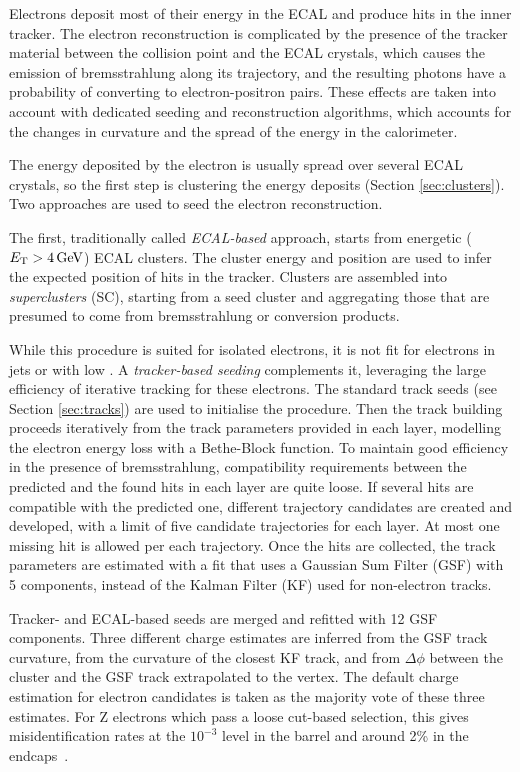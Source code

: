 \label{sec:eleReco}
Electrons deposit most of their energy in the ECAL and produce hits in the inner tracker.
The electron reconstruction is complicated by the presence of the tracker material between the collision point and the ECAL crystals,
which causes the emission of bremsstrahlung along its trajectory, and the resulting photons have a probability of converting to electron-positron pairs.
These effects are taken into account with dedicated seeding and reconstruction algorithms,
which accounts for the changes in curvature and the spread of the energy in the calorimeter.

The energy deposited by the electron is usually spread over several ECAL crystals, so the first step is clustering the energy deposits (Section \ref{sec:clusters}).
Two approaches are used to seed the electron reconstruction.

The first, traditionally called \textit{ECAL-based} approach, starts from energetic ($E_{\mathrm{T}} > 4\,\text{Ge\hspace{-.08em}V}$) ECAL clusters.
The cluster energy and position are used to infer the expected position of hits in the tracker.
Clusters are assembled into \textit{superclusters} (SC),
starting from a seed cluster and aggregating those that are presumed to come from bremsstrahlung or conversion products.

While this procedure is suited for isolated electrons, it is not fit for electrons in jets or with low \pt.
A \textit{tracker-based seeding} complements it, leveraging the large efficiency of iterative tracking for these electrons.
The standard track seeds (see Section \ref{sec:tracks}) are used to initialise the procedure.
Then the track building proceeds iteratively from the track parameters provided in each layer, modelling the electron energy loss with a Bethe-Block function.
To maintain good efficiency in the presence of bremsstrahlung, compatibility requirements between the predicted and the found hits in each layer are quite loose.
If several hits are compatible with the predicted one, different trajectory candidates are created and developed,
with a limit of five candidate trajectories for each layer.
At most one missing hit is allowed per each trajectory.
Once the hits are collected, the track parameters are estimated with a fit that uses a Gaussian Sum Filter (GSF) \cite{CMS-NOTE-2005-001} with 5 components,
instead of the Kalman Filter (KF) \cite{billoir.qian:simultaneous} used for non-electron tracks.

Tracker- and ECAL-based seeds are merged and refitted with 12 GSF components.
Three different charge estimates are inferred from the GSF track curvature,
from the curvature of the closest KF track, and from $\Delta\phi$ between the cluster and the GSF track extrapolated to the vertex.
The default charge estimation for electron candidates is taken as the majority vote of these three estimates.
For Z electrons which pass a loose cut-based selection, this gives misidentification rates at the $10^{-3}$ level in the barrel
and around 2\usep\% in the endcaps~\cite{Rembser_2019}.
